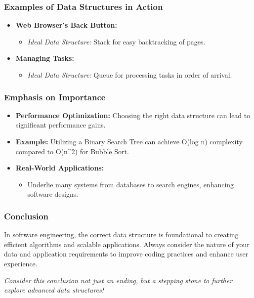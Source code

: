 \documentclass{beamer}
\begin{document}
\begin{frame}[fragile]
    \frametitle{Examples of Data Structures in Action}
    \begin{itemize}
        \item \textbf{Web Browser's Back Button:}
        \begin{itemize}
            \item \textit{Ideal Data Structure:} Stack for easy backtracking of pages.
        \end{itemize}
        
        \item \textbf{Managing Tasks:}
        \begin{itemize}
            \item \textit{Ideal Data Structure:} Queue for processing tasks in order of arrival.
        \end{itemize}
    \end{itemize}
\end{frame}

\begin{frame}[fragile]
    \frametitle{Emphasis on Importance}
    \begin{itemize}
        \item \textbf{Performance Optimization:}
        Choosing the right data structure can lead to significant performance gains. 
        \item \textbf{Example:} Utilizing a Binary Search Tree can achieve O(log n) complexity compared to O(n^2) for Bubble Sort.
        
        \item \textbf{Real-World Applications:}
        \begin{itemize}
            \item Underlie many systems from databases to search engines, enhancing software designs.
        \end{itemize}
    \end{itemize}
\end{frame}

\begin{frame}[fragile]
    \frametitle{Conclusion}
    In software engineering, the correct data structure is foundational to creating efficient algorithms and scalable applications. Always consider the nature of your data and application requirements to improve coding practices and enhance user experience.
    
    \vspace{0.5cm}
    \textit{Consider this conclusion not just an ending, but a stepping stone to further explore advanced data structures!}
\end{frame}
\end{document}
